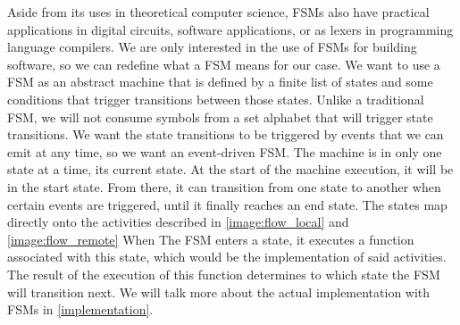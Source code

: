 Aside from its uses in theoretical computer science, FSMs also have practical applications in digital circuits, software applications, or as lexers in programming language compilers.
We are only interested in the use of FSMs for building software, so we can redefine what a FSM means for our case.
We want to use a FSM as an abstract machine that is defined by a finite list of states and some conditions that trigger transitions between those states.
Unlike a traditional FSM, we will not consume symbols from a set alphabet that will trigger state transitions.
We want the state transitions to be triggered by events that we can emit at any time, so we want an event-driven FSM.
The machine is in only one state at a time, its current state.
At the start of the machine execution, it will be in the start state.
From there, it can transition from one state to another when certain events are triggered, until it finally reaches an end state.
The states map directly onto the activities described in \autoref{image:flow_local} and \autoref{image:flow_remote}
When The FSM enters a state, it executes a function associated with this state, which would be the implementation of said activities.
The result of the execution of this function determines to which state the FSM will transition next.
We will talk more about the actual implementation with FSMs in \autoref{implementation}.
